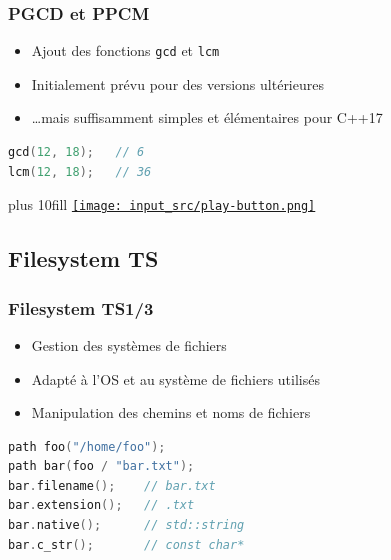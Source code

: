 \documentclass[C++.tex]{subfiles}
\begin{document}
\begin{frame}[fragile]
	\frametitle{PGCD et PPCM}
	\begin{itemize}
		\item Ajout des fonctions \lstinline|gcd| et \lstinline|lcm|
		\item Initialement prévu pour des versions ultérieures
		\item \ldots{}mais suffisamment simples et élémentaires pour C++17 
	\end{itemize}

	\begin{lstlisting}[language=C++]
gcd(12, 18);   // 6
lcm(12, 18);   // 36\end{lstlisting}

	\vskip 10mm plus 10fill
	\hfill
	\href{https://godbolt.org/#g:!((g:!((g:!((h:codeEditor,i:(filename:'1',fontScale:14,fontUsePx:'0',j:1,lang:c%2B%2B,selection:(endColumn:1,endLineNumber:9,positionColumn:1,positionLineNumber:9,selectionStartColumn:1,selectionStartLineNumber:9,startColumn:1,startLineNumber:9),source:'%23include+%3Ciostream%3E%0A%23include+%3Cnumeric%3E%0A%0Aint+main()%0A%7B%0A++std::cout+%3C%3C+std::gcd(12,+18)+%3C%3C+!'%5Cn!'%3B%0A++std::cout+%3C%3C+std::lcm(12,+18)+%3C%3C+!'%5Cn!'%3B%0A%7D%0A'),l:'5',n:'0',o:'C%2B%2B+source+%231',t:'0')),k:50,l:'4',n:'0',o:'',s:0,t:'0'),(g:!((h:executor,i:(argsPanelShown:'1',compilationPanelShown:'0',compiler:g112,compilerOutShown:'0',execArgs:'',execStdin:'',fontScale:14,fontUsePx:'0',j:1,lang:c%2B%2B,libs:!((name:boost,ver:'175')),options:'-std%3Dc%2B%2B17+-Wall+-Wextra',source:1,stdinPanelShown:'1',tree:'1',wrap:'0'),l:'5',n:'0',o:'Executor+x86-64+gcc+11.2+(C%2B%2B,+Editor+%231)',t:'0')),header:(),k:50,l:'4',n:'0',o:'',s:0,t:'0')),l:'2',n:'0',o:'',t:'0')),version:4}{\texttt{[image: input\_src/play-button.png]}}
\end{frame}

\subsection*{Filesystem TS}
\begin{frame}[fragile]
	\frametitle{Filesystem TS\titlehfill{}1/3}
	\begin{itemize}
		\item Gestion des systèmes de fichiers
		\item Adapté à l'OS et au système de fichiers utilisés
		\item Manipulation des chemins et noms de fichiers
	\end{itemize}

	\begin{lstlisting}[language=C++]
path foo("/home/foo");
path bar(foo / "bar.txt");
bar.filename();    // bar.txt
bar.extension();   // .txt
bar.native();      // std::string
bar.c_str();       // const char*\end{lstlisting}
\end{frame}
\end{document}
